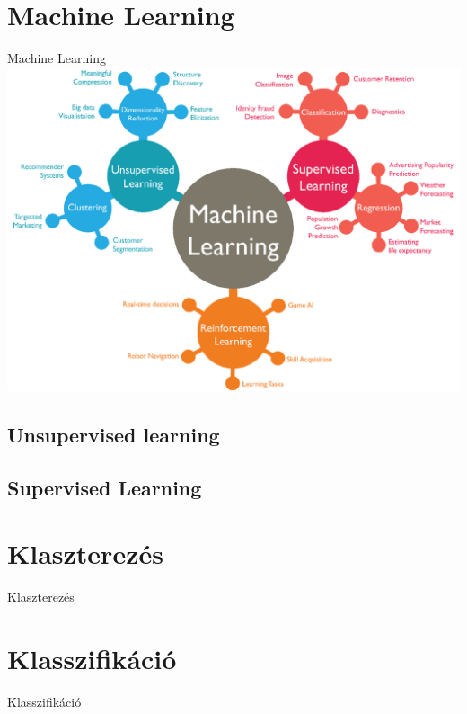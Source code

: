 \documentclass{beamer}
\begin{document}
\section{Machine Learning}
\begin{frame}{Machine Learning}
    \centering
    \includegraphics[scale=0.17]{machine_learning.png}    
\end{frame}
\subsection{Unsupervised learning}
\subsection{Supervised Learning}

\section{Klaszterezés}
\begin{frame}{Klaszterezés}

\end{frame}

\section{Klasszifikáció}
\begin{frame}{Klasszifikáció}

\end{frame}
\end{document}
